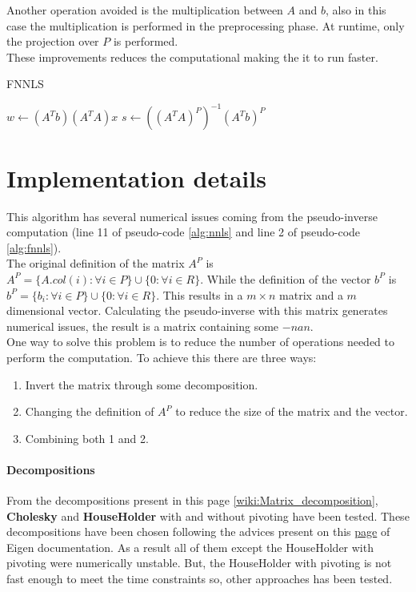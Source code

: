 Another operation avoided is the multiplication between $A$ and $b$, also in this case the multiplication is performed in the preprocessing phase. At runtime, only the projection over $P$ is performed. \\
These improvements reduces the computational making the it to run faster. 
\begin{algorithm}[h]
  \caption{FNNLS}
  \label{alg:fnnls}
  \begin{algorithmic}[1]
    \State $w \gets (A^T b) (A^T A)x $
    \State $s \gets ((A^TA)^P)^{-1} (A^Tb)^P$
  \end{algorithmic}
\end{algorithm}
\section{Implementation details}
This algorithm has several numerical issues coming from the pseudo-inverse computation (line 11 of pseudo-code \ref{alg:nnls} and line 2 of pseudo-code \ref{alg:fnnls}). \\
The original definition of the matrix $A^P$ is $A^P=\{A.col(i) : \forall i \in P\} \cup \{0: \forall i \in R\}$. While the definition of the vector $b^P$ is $b^P=\{b_i : \forall i \in P\} \cup \{0: \forall i \in R\}$. This results in a $m \times n$ matrix and a $m$ dimensional vector. Calculating the pseudo-inverse with this matrix generates numerical issues, the result is a matrix containing some $-nan$.\\
One way to solve this problem is to reduce the number of operations needed to perform the computation. To achieve this there are three ways:
\begin{enumerate}
  \item Invert the matrix through some decomposition.
  \item Changing the definition of $A^P$ to reduce the size of the matrix and the vector.
  \item Combining both 1 and 2.
\end{enumerate}
\paragraph{Decompositions}
From the decompositions present in this page \ref{wiki:Matrix_decomposition}, \textbf{Cholesky} and \textbf{HouseHolder} with and without pivoting have been tested. These decompositions have been chosen following the advices present on this \href{https://eigen.tuxfamily.org/dox/group__LeastSquares.html}{page} of Eigen documentation. As a result all of them except the HouseHolder with pivoting were numerically unstable. But, the HouseHolder with pivoting is not fast enough to meet the time constraints so, other approaches has been tested.
